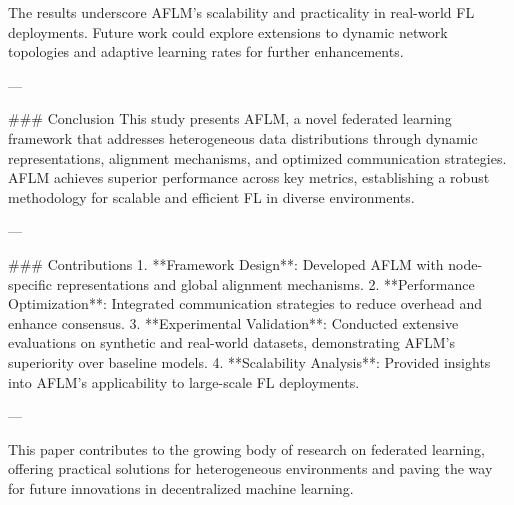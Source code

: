 The results underscore AFLM's scalability and practicality in real-world FL deployments. Future work could explore extensions to dynamic network topologies and adaptive learning rates for further enhancements.

---

### Conclusion
This study presents AFLM, a novel federated learning framework that addresses heterogeneous data distributions through dynamic representations, alignment mechanisms, and optimized communication strategies. AFLM achieves superior performance across key metrics, establishing a robust methodology for scalable and efficient FL in diverse environments.

---

### Contributions
1. **Framework Design**: Developed AFLM with node-specific representations and global alignment mechanisms.
2. **Performance Optimization**: Integrated communication strategies to reduce overhead and enhance consensus.
3. **Experimental Validation**: Conducted extensive evaluations on synthetic and real-world datasets, demonstrating AFLM's superiority over baseline models.
4. **Scalability Analysis**: Provided insights into AFLM's applicability to large-scale FL deployments.

---

This paper contributes to the growing body of research on federated learning, offering practical solutions for heterogeneous environments and paving the way for future innovations in decentralized machine learning.